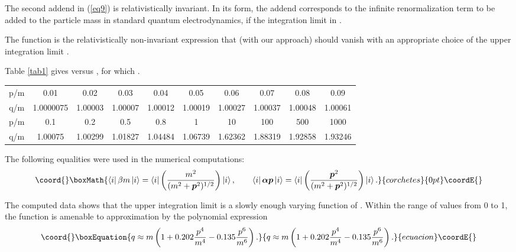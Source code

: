 \documentclass[a4paper,draft,showpacs,preprint,prd,aps]{revtex4}
\begin{document}
The second addend in (\ref{eq9}) is relativistically invariant. In its form,
the
addend corresponds to the infinite renormalization term to be added to the
particle mass in standard quantum electrodynamics, if the integration limit
\coordHE{} in \coordHE{}.

The function \coordHE{} is the relativistically non-invariant
expression that (with our approach) should vanish with an appropriate choice
of the upper integration limit \coordHE{}.

Table \ref{tab1} gives \coordHE{} versus \coordHE{}, for which
\coordHE{}.

\begin{table*}[h]
\caption{The upper integration limit \coordHE{}}
\label{tab1}
\begin{ruledtabular}
\begin{tabular}{cccccccccc}
p/m& 0.01& 0.02& 0.03& 0.04& 0.05& 0.06& 0.07& 0.08& 0.09 \\
q/m& 1.0000075& 1.00003& 1.00007& 1.00012& 1.00019& 1.00027& 1.00037&
1.00048& 1.00061\\
\hline
p/m& 0.1& 0.2& 0.5& 0.8& 1& 10& 100& 500& 1000  \\
q/m& 1.00075& 1.00299& 1.01827& 1.04484& 1.06739& 1.62362& 1.88319&
1.92858& 1.93246
\end{tabular}
\end{ruledtabular}
\end{table*}

The following equalities were used in the numerical computations:
\[\coord{}\boxMath{
\left\langle i \right|\beta m \left| i \right\rangle =
\left\langle i \right|\left( \frac{m^2}{(m^2 + \bm{p}^2)^{1/2}}\right)
\left| i \right\rangle,\qquad
\left\langle i \right| \bm{\alpha}\bm{p}\left| i \right\rangle =
\left\langle i \right|\left( \frac{\bm{p}^2}{(m^2 + \bm{p}^2)^{1/2}}\right)
\left| i \right\rangle.
}{corchetes}{0pt}\coordE{}\]

The computed data shows that the upper integration limit \coordHE{} is a
slowly enough varying function of \coordHE{}. Within the range of
\coordHE{} values from 0 to 1, the function is amenable to
approximation by the polynomial expression
\begin{equation}\coord{}\boxEquation{
\label{eq10}
q \approx m\left(1 + 0.202\frac{p^4}{m^4} -
0.135\frac{p^6}{m^6}\right).
}{
q \approx m\left(1 + 0.202\frac{p^4}{m^4} -
0.135\frac{p^6}{m^6}\right).
}{ecuacion}\coordE{}\end{equation}
\end{document}
